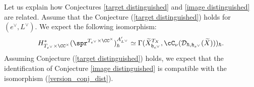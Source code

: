 \documentclass[12pt]{amsart}
\begin{document}
 
\begin{rmk}\label{lemma_reduce_im_distinguished}
    Let us explain how  Conjectures \ref{target distinguished} and \ref{image distinguished} are related. Assume that the Conjecture (\ref{target distinguished}) holds for $(e^\vee,L^\vee)$. We expect the following isomorphism:
\begin{equation}\label{version_conj_dist}
H^{*}_{T_{e^\vee} \times \CC^\times}(\spr^{T_{e^\vee} \times \CC^\times})^{A'_{L^\vee}}_{\hbar} \simeq \Gamma(\widetilde{X}^{T_X}_{\mathfrak{h}_{e^\vee}},\cC_\nu(\mathcal{D}_{\hbar,\mathfrak{h}_{e^\vee}}(\widetilde{X})))_{\hbar}.
\end{equation}
Assuming Conjecture  (\ref{target distinguished}) holds, we expect that the identification of Conjecture \ref{image distinguished} is compatible with the isomorphism (\ref{version_conj_dist}). 
\end{rmk}
\end{document}
